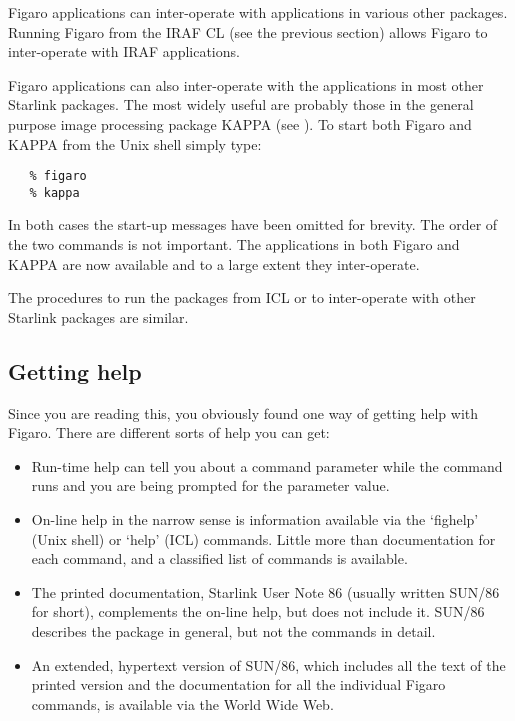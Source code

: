    Figaro applications can inter-operate with applications in various
   other packages.  Running Figaro from the IRAF CL (see the previous
   section) allows Figaro to inter-operate with IRAF applications.

   Figaro applications can also inter-operate with the applications in
   most other Starlink packages.   The most widely useful are
   probably those in the general purpose image processing package
   KAPPA (see ).  To start both Figaro and KAPPA
   from the Unix shell simply type:

\begin{verbatim}
   % figaro
   % kappa
\end{verbatim}

   In both cases the start-up messages have been omitted for brevity.
   The order of the two commands is not important.  The applications in
   both Figaro and KAPPA are now available and to a large extent they
   inter-operate.

   The procedures to run the packages from ICL or to inter-operate with
   other Starlink packages are similar.


\subsection{\label{gethelp}Getting help}

   Since you are reading this, you obviously found one way of getting
   help with Figaro. There are different sorts of help you can get:

\begin{itemize}
\item
   Run-time help can tell you about a command parameter while the
   command runs and you are being prompted for the parameter value.
\item
   On-line help in the narrow sense is information available via the
   `fighelp' (Unix shell) or `help' (ICL) commands.  Little more than
   documentation for each command, and a classified list of commands is
   available.
\item
   The printed documentation, Starlink User Note 86 (usually written
   SUN/86 for short), complements the on-line help, but does not include
   it.  SUN/86 describes the package in general, but not the commands in
   detail.
\item
   An extended, hypertext version of SUN/86, which includes all the
   text of the printed version and the documentation for all the individual
   Figaro commands, is available via the World Wide Web.
\end{itemize}

